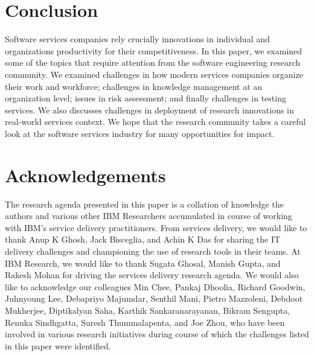\documentclass{sig-alternate}
\begin{document}








%




\section{Conclusion}
\label{sec:conclusion}

Software services companies rely crucially innovations in individual and
organizations productivity for their competitiveness. In this paper, we examined
some of the topics that require attention from the software engineering research
community. We examined challenges in how modern services companies organize
their work and workforce; challenges in knowledge management at an organization
level; issues in risk assessment; and finally challenges in testing services. We
also discusses challenges in deployment of research innovations in real-world
services context. We hope that the research community takes a careful look at
the software services industry for many opportunities for impact.

\section*{Acknowledgements}
The research agenda presented in this paper is a collation of knowledge the
authors and various other IBM Researchers accumulated in course of working with
IBM's service delivery practitioners. From services delivery, we would like to
thank Anup K Ghosh, Jack Bisceglia, and Achin K Das for sharing the IT delivery
challenges and championing the use of research tools in their teams. At IBM
Research, we would like to thank Sugata Ghosal, Manish Gupta, and Rakesh Mohan
for driving the services delivery research agenda. We would also like to
acknowledge our colleagues Min Chee, Pankaj Dhoolia, Richard Goodwin, Juhnyoung
Lee, Debapriyo Majumdar, Senthil Mani, Pietro Mazzoleni, Debdoot Muk\-herjee,
Diptikalyan Saha, Karthik Sankaranarayanan, Bikram Sengupta, Renuka Sindhgatta,
Suresh Thummalapenta, and Joe Zhou, who have been involved in various research
initiatives during course of which the challenges listed in this paper were
identified.


{\small

}
\end{document}
